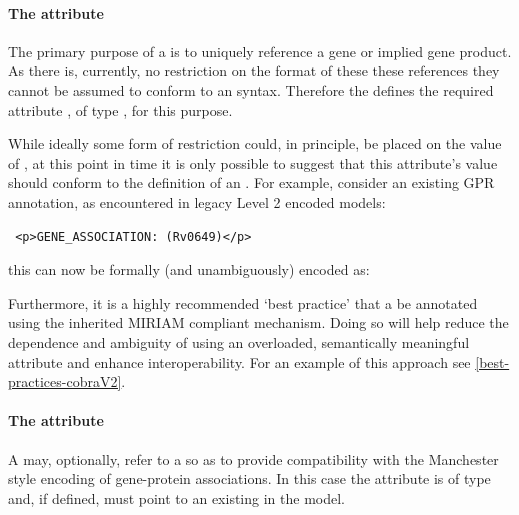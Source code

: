 \paragraph{The  attribute}
The primary purpose of a \GeneProduct is to uniquely reference a gene or
implied gene product. As there is, currently, no restriction on the format of these these references they cannot be assumed to conform to an \SBML {} syntax. Therefore the \FBCPackage defines the required attribute , of type , for this purpose.

While ideally some form of restriction could, in principle, be placed on the value of , at this point in time it is only possible to suggest that this attribute's value should conform to the definition of an
. For example, consider an existing GPR annotation, as encountered in legacy \SBML Level 2 encoded models:
\begin{verbatim}
 <p>GENE_ASSOCIATION: (Rv0649)</p>
\end{verbatim}
%
this can now be formally (and unambiguously) encoded as:
%

Furthermore, it is a highly recommended `best practice' that a \GeneProduct be annotated using the inherited MIRIAM compliant \SBML \Annotation mechanism. Doing so will help reduce the dependence and ambiguity of using an overloaded, semantically meaningful  attribute and enhance interoperability. For an example of this approach see \ref{best-practices-cobraV2}.

\paragraph{The  attribute}
A \GeneProduct may, optionally, refer to a \Species so as to provide compatibility with the Manchester style encoding of gene-protein associations. In this case the attribute  is of type  and, if defined, must point to an existing \Species in the model.

